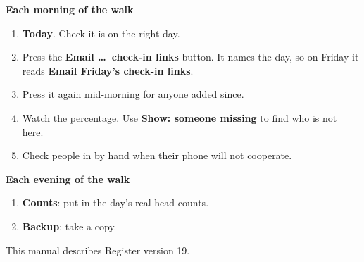 \documentclass[12pt]{article}
\newcommand{\btn}[1]{\textbf{#1}}
\begin{document}
\textbf{Each morning of the walk}

\begin{enumerate}[leftmargin=*,itemsep=4pt]
\item \btn{Today}. Check it is on the right day.
\item Press the \btn{Email \ldots\ check-in links} button. It names the
  day, so on Friday it reads \btn{Email Friday's check-in links}.
\item Press it again mid-morning for anyone added since.
\item Watch the percentage. Use \btn{Show: someone missing} to find who
  is not here.
\item Check people in by hand when their phone will not cooperate.
\end{enumerate}

\textbf{Each evening of the walk}

\begin{enumerate}[leftmargin=*,itemsep=4pt]
\item \btn{Counts}: put in the day's real head counts.
\item \btn{Backup}: take a copy.
\end{enumerate}

\vfill
{\small This manual describes Register version 19.\par}
\end{document}
